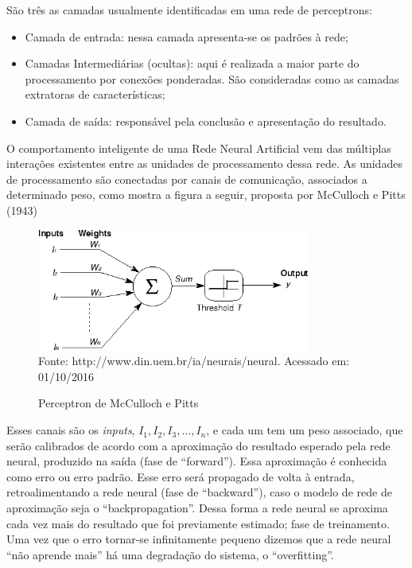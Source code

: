 São três as camadas usualmente identificadas em uma rede de perceptrons:
\begin{itemize}
 \item Camada de entrada: nessa camada apresenta-se os padrões à rede;
 \item Camadas Intermediárias (ocultas): aqui é realizada a maior parte do processamento por conexões ponderadas. São consideradas como as camadas 
 extratoras de características;
 \item Camada de saída: responsável pela conclusão e apresentação do resultado.
\end{itemize}

O comportamento inteligente de uma Rede Neural Artificial vem das múltiplas interações existentes entre as unidades de processamento dessa rede. 
As unidades de processamento são conectadas por canais de comunicação, associados a determinado peso, como mostra a figura a seguir, proposta por McCulloch e Pitts (1943)

\begin{figure}[!ht]
\centering
\caption{Perceptron de McCulloch e Pitts}
\vspace{1mm}
\includegraphics[width=90mm, height=40mm]{Figuras/Neural/Perceptron.png}\\
\tiny Fonte: http://www.din.uem.br/ia/neurais/neural. Acessado em: 01/10/2016
\end{figure}

Esses canais são os  \textit{inputs}, $ I_{1}, I_{2}, I_{3},...,I_{n}$, e cada um tem um peso associado, que serão calibrados de acordo 
com a aproximação do resultado esperado pela rede neural, produzido na saída (fase de ``forward''). 
Essa aproximação é conhecida como erro ou erro padrão. Esse erro será propagado de volta à entrada, retroalimentando a rede neural (fase de ``backward''), 
caso o modelo de rede de aproximação seja o ``backpropagation''. Dessa forma a rede neural se aproxima cada vez mais do resultado que foi previamente estimado; fase de treinamento.
Uma vez que o erro tornar-se infinitamente pequeno dizemos que a rede neural ``não aprende mais'' há uma degradação do sistema, o ``overfitting''.



